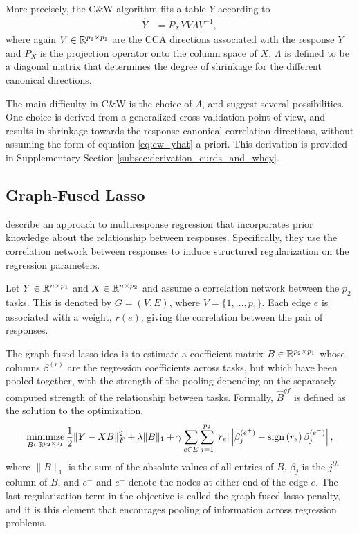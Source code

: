 \documentclass{article}
\begin{document}
More precisely, the C\&W algorithm fits a table $Y$ according to
\begin{align}
  \hat{Y} &= P_{X}YV\Lambda V^{-1}, \label{eq:cw_yhat}
\end{align}
where again $V \in \mathbb{R}^{p_{1} \times p_{1}}$ are the CCA directions
associated with the response $Y$ and $P_{X}$ is the projection operator onto the
column space of $X$. $\Lambda$ is defined to be a diagonal matrix that determines
the degree of shrinkage for the different canonical directions.

The main difficulty in C\&W is the choice of $\Lambda$, and
\cite{breiman1997predicting} suggest several possibilities. One choice is
derived from a generalized cross-validation point of view, and results in
shrinkage towards the response canonical correlation directions, without
assuming the form of equation \ref{eq:cw_yhat} a priori. This derivation is
provided in Supplementary Section \ref{subsec:derivation_curds_and_whey}.

\subsection{Graph-Fused Lasso}
\label{subsec:graph_fused_lasso}

\cite{chen2010graph} describe an approach to multiresponse regression that
incorporates prior knowledge about the relationship between responses.
Specifically, they use the correlation network between responses to induce
structured regularization on the regression parameters.

Let $Y \in \mathbb{R}^{n \times p_{1}}$ and $X \in \mathbb{R}^{n \times p_{2}}$ and
assume a correlation network between the $p_{2}$ tasks. This is denoted by $G =
\left(V, E\right)$, where $V = \{1, \dots, p_{1}\}$. Each edge $e$ is associated
with a weight, $r\left(e\right)$, giving the correlation between the pair of
responses.

The graph-fused lasso idea is to estimate a coefficient matrix $B \in
\mathbb{R}^{p_{2} \times p_{1}}$ whose columns $\beta^{(r)}$ are the regression
coefficients across tasks, but which have been pooled together, with the
strength of the pooling depending on the separately computed strength of the
relationship between tasks. Formally, $\hat{B}^{gf}$ is defined as the solution
to the optimization,
\begin{align}
\mathop\mathrm{minimize}_{B \in \mathbb{R}^{p_{2} \times p_{1}}} \frac{1}{2}\|Y -
  XB\|_{F}^{2} + \lambda \|B\|_{1} + \gamma \sum_{e \in E} \sum_{j =
    1}^{p_{2}} \left|r_{e}\right|\left|\beta_{j}^{(e^{+})} -
      \mathop\mathrm{sign}\left(r_{e}\right) \beta^{(e^{-})}_{j}\right|, \label{eq:gflasso_obj}
\end{align}
where $\|B\|_{1}$ is the sum of the absolute values of all entries of $B$,
$\beta_j$ is the $j^{th}$ column of $B$, and $e^{-}$ and $e^{+}$ denote the
nodes at either end of the edge $e$. The last regularization term in the
objective is called the graph fused-lasso penalty, and it is this element that
encourages pooling of information across regression problems.
\end{document}
